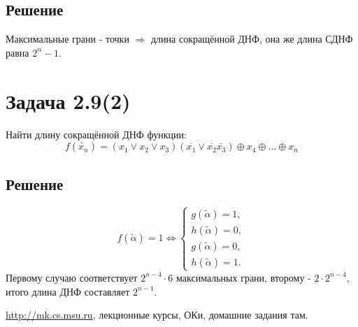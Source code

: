 \documentclass[11pt]{article}
\begin{document}
\subsection{Решение}
\label{sec:org039b8be}
   Максимальные грани - точки $\Rightarrow$ длина сокращённой ДНФ, она же длина СДНФ равна
$2^n - 1$.
\section{Задача 2.9(2)}
\label{sec:orgb3cf195}
Найти длину сокращённой ДНФ функции:
  \begin{equation}
f(\tilde{x_n}) = (x_1\vee x_2\vee x_3)(\overline{x_1}\vee\overline{x_2}\overline{x_3})\oplus
x_4\oplus\ldots\oplus x_n
  \end{equation}
\subsection{Решение}
\label{sec:org3d6364a}
\begin{equation}
f(\tilde{\alpha}) = 1 \Leftrightarrow \begin{cases}
g(\tilde{\alpha}) = 1, \\
h(\tilde{\alpha}) = 0, \\
g(\tilde{\alpha}) = 0, \\
h(\tilde{\alpha}) = 1.
   \end{cases}
\end{equation}
Первому случаю соответствует $2^{n - 4}\cdot6$ максимальных грани, второму - $2\cdot2^{n - 4}$,
итого длина ДНФ составляет $2^{n - 1}$.

\url{http://mk.cs.msu.ru}, лекционные курсы, ОКи, домашние задания там.
\end{document}
